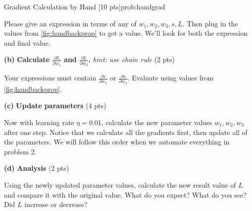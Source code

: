 \begin{problem}{Gradient Calculation by Hand \hfill [10 pts]}{prob:handgrad}
\begin{adjustwidth}{2em}{2em}
\begin{adjustwidth}{2em}{2em}
Please give an expression in terms of any of $w_1, w_2, w_3, s, L$. Then
plug in the values from \cref{fig:handbackprop} to get a value. We'll look
for both the expression and final value.\\
\end{adjustwidth} 
\vspace{5px}

\textbf{(b)} \textbf{Calculate $\frac{\partial L}{\partial w_1}$ and
$\frac{\partial L}{\partial w_2}$.} \textit{hint: use chain rule} \hfill (2
pts)
\begin{adjustwidth}{2em}{2em}
Your expressions must contain $\frac{\partial s}{\partial w_1}$ or
$\frac{\partial s}{\partial w_2}$. Evaluate using values from
\cref{fig:handbackprop}. \\
\end{adjustwidth} 
\vspace{5px}

\textbf{(c)} \textbf{Update parameters} \hfill (4 pts)
\begin{adjustwidth}{2em}{2em}
    Now with learning rate $\eta = 0.01$, calculate the new parameter values
    $w_1, w_2, w_3$ after one step. Notice that we calculate all the
    gradients first, then update all of the parameters. We will follow this
    order when we automate everything in problem 2.\\ 
\end{adjustwidth}

\textbf{(d)} \textbf{Analysis} \hfill (2 pts)
\begin{adjustwidth}{2em}{2em}
    Using the newly updated parameter values, calculate the new result value
    of $L$ and compare it with the original value. What do you expect? What
    do you see? Did $L$ increase or decrease?
\end{adjustwidth}
\end{adjustwidth}

\end{problem}

